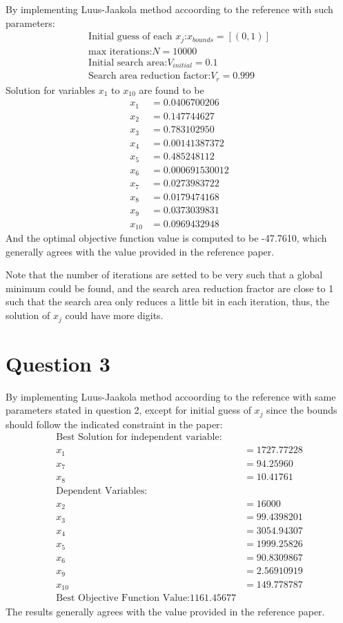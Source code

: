 \documentclass[a4paper,12pt]{article} %
\begin{document}
By implementing Luus-Jaakola method accoording to the reference with such parameters:
\begin{align*}
    \text{Initial guess of each $x_j$:} x_{bounds} = [(0, 1)]\\
    \text{max iterations:} N=10000\\
    \text{Initial search area:} V_{initial}=0.1\\
    \text{Search area reduction factor:} V_{r}=0.999
\end{align*}
Solution for variables $x_1$ to $x_{10} $ are found to be 
\begin{align*}
    x_1 &= 0.0406700206 \\
    x_2 &= 0.147744627 \\
    x_3 &= 0.783102950 \\
    x_4 &= 0.00141387372 \\
    x_5 &= 0.485248112 \\
    x_6 &= 0.000691530012 \\
    x_7 &= 0.0273983722 \\
    x_8 &= 0.0179474168 \\
    x_9 &= 0.0373039831 \\
    x_{10} &= 0.0969432948
\end{align*}
And the optimal objective function value is computed to be -47.7610, which generally agrees with the value provided
in the reference paper.

Note that the number of iterations are setted to be very such that a global minimum could be found, and the search area
reduction fractor are close to 1 such that the search area only reduces a little bit in each iteration, thus, the solution of 
$x_j$ could have more digits.

\section*{\textbf{Question 3}}

By implementing Luus-Jaakola method accoording to the reference with same parameters stated in question 2, except for initial guess of 
$x_j$ since the bounds should follow the indicated constraint in the paper:
\begin{align*}
\text{Best Solution for independent variable:} \\
x_1 &= 1727.77228\\
x_7 &= 94.25960\\
x_8 &= 10.41761\\
\text{Dependent Variables:}\\
x_2 &= 16000 \\
x_3 &=  99.4398201\\
x_4 &=  3054.94307\\
x_5 &=  1999.25826\\
x_6 &= 90.8309867 \\
x_9 &= 2.56910919 \\
x_{10} &= 149.778787 \\
\text{Best Objective Function Value:} 1161.45677
\end{align*}
The results generally agrees with the value provided in the reference paper.
\end{document}
